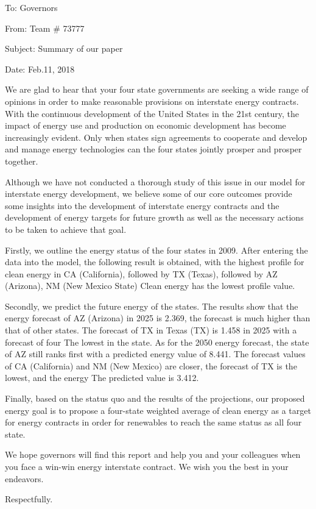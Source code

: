 \documentclass[a4paper]{article}
\begin{document}
To: Governors 

From: Team \# 73777

Subject: Summary of our paper

Date: Feb.11, 2018

We are glad to hear that your four state governments are seeking a wide range of opinions in order to make reasonable provisions on interstate energy contracts. With the continuous development of the United States in the 21st century, the impact of energy use and production on economic development has become increasingly evident. Only when states sign agreements to cooperate and develop and manage energy technologies can the four states jointly prosper and prosper together.

Although we have not conducted a thorough study of this issue in our model for interstate energy development, we believe some of our core outcomes provide some insights into the development of interstate energy contracts and the development of energy targets for future growth as well as the necessary actions to be taken to achieve that goal.

Firstly, we outline the energy status of the four states in 2009. After entering the data into the model, the following result is obtained, with the highest profile for clean energy in CA (California), followed by TX (Texas), followed by AZ (Arizona), NM (New Mexico State) Clean energy has the lowest profile value.

Secondly, we predict the future energy of the states. The results show that the energy forecast of AZ (Arizona) in 2025 is 2.369, the forecast is much higher than that of other states. The forecast of TX in Texas (TX) is 1.458 in 2025 with a forecast of four The lowest in the state. As for the 2050 energy forecast, the state of AZ still ranks first with a predicted energy value of 8.441. The forecast values of CA (California) and NM (New Mexico) are closer, the forecast of TX is the lowest, and the energy The predicted value is 3.412.

Finally, based on the status quo and the results of the projections, our proposed energy goal is to propose a four-state weighted average of clean energy as a target for energy contracts in order for renewables to reach the same status as all four state.

We hope governors will find this report and help you and your colleagues when you face a win-win energy interstate contract. We wish you the best in your endeavors.

Respectfully.
\end{document}
